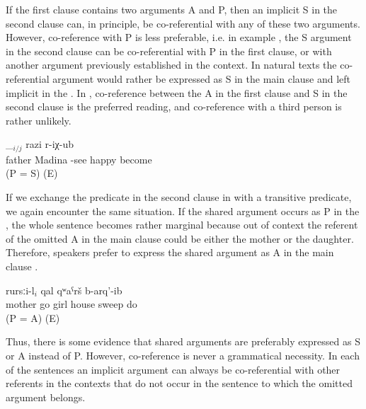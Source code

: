 If the first clause contains two arguments A and P, then an implicit S in the second clause can, in principle, be co-referential with any of these two arguments. However, co-reference with P is less preferable, i.e. in example , the S argument in the second clause can be co-referential with P in the first clause, or with another argument previously established in the context. In natural texts the co-referential argument would rather be expressed as S in the main clause and left implicit in the . In , co-reference between the A in the first clause and S in the second clause is the preferred reading, and co-reference with a third person is rather unlikely. 
%
\begin{exe}
	\ex	\label{ex:Father saw Madina and (she) got happy@40}
		\_$_{i/j}$	razi	r-iχ-ub\\
		father 	Madina	-see		happy	become\\
	\glt	{} (P = S) (E)
\end{exe}

If we exchange the predicate in the second clause in  with a transitive predicate, we again encounter the same situation. If the shared argument occurs as P in the , the whole sentence becomes rather marginal because out of context the referent of the omitted A in the main clause could be either the mother or the daughter. Therefore, speakers prefer to express the shared argument as A in the main clause .
%
 \begin{exe}
	\ex	\label{ex:Mother called her daughter and she swept the house@41}
	\gll	[aba-l	\_$_{i}$ až-aq-ur-re]	rursːi-l$_{i}$	qal	qʷaˁrš b-arq'-ib\\
		mother 	go	girl	house	sweep do\\
	\glt	{} (P = A) (E)
\end{exe}

Thus, there is some evidence that shared arguments are preferably expressed as S or A instead of P. However, co-reference is never a grammatical necessity. In each of the sentences an implicit argument can always be co-referential with other referents in the contexts that do not occur in the sentence to which the omitted argument belongs.

